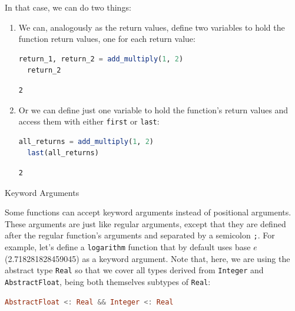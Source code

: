 \documentclass[
  notoc %
]{tufte-book}
\makeatletter
\newcommand{\passthrough}[1]{#1}
\renewcommand\subsubsection{%
\@startsection{subsubsection}{3}{\z@ }{-3.25ex\@plus -1ex \@minus -.2ex}{1.5ex \@plus .2ex}{\normalfont \normalsize \bfseries }
}
\makeatother
\begin{document}
In that case, we can do two things:

\begin{enumerate}
\def\labelenumi{\arabic{enumi}.}
\item
  We can, analogously as the return values, define two variables to hold
  the function return values, one for each return value:

  \begin{lstlisting}[language=Julia]
  return_1, return_2 = add_multiply(1, 2)
  return_2
  \end{lstlisting}

  \begin{lstlisting}[language=Output]
  2
  \end{lstlisting}
\item
  Or we can define just one variable to hold the function's return
  values and access them with either \passthrough{\lstinline!first!} or
  \passthrough{\lstinline!last!}:

  \begin{lstlisting}[language=Julia]
  all_returns = add_multiply(1, 2)
  last(all_returns)
  \end{lstlisting}

  \begin{lstlisting}[language=Output]
  2
  \end{lstlisting}
\end{enumerate}

\hypertarget{sec:function_keyword_arguments}{%
\subsubsection{Keyword Arguments}\label{sec:function_keyword_arguments}}

Some functions can accept keyword arguments instead of positional
arguments. These arguments are just like regular arguments, except that
they are defined after the regular function's arguments and separated by
a semicolon \passthrough{\lstinline!;!}. For example, let's define a
\passthrough{\lstinline!logarithm!} function that by default uses base
\(e\) (2.718281828459045) as a keyword argument. Note that, here, we are
using the abstract type \passthrough{\lstinline!Real!} so that we cover
all types derived from \passthrough{\lstinline!Integer!} and
\passthrough{\lstinline!AbstractFloat!}, being both themselves subtypes
of \passthrough{\lstinline!Real!}:

\begin{lstlisting}[language=Julia]
AbstractFloat <: Real && Integer <: Real
\end{lstlisting}
\end{document}
